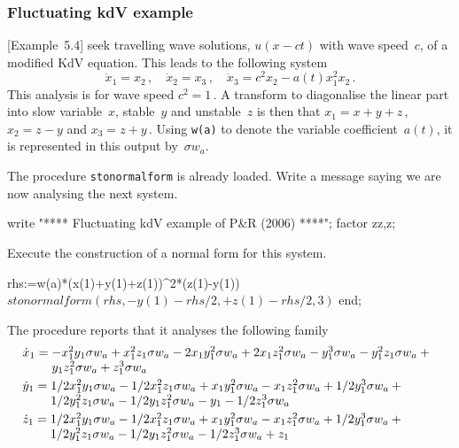 \subsubsection{Fluctuating kdV example}

\cite{Potzsche2006} [Example~5.4] seek travelling wave solutions, $u(x-ct)$ with wave speed~$c$, of a modified KdV equation.  
This leads to the following system 
\begin{equation*}
\dot x_1=x_2\,,\quad
\dot x_2=x_3\,,\quad
\dot x_3=c^2x_2-a(t)x_1^2x_2\,.
\end{equation*}
This analysis is for wave speed $c^2=1$\,.
A transform to diagonalise the linear part into slow variable~$x$, stable~$y$ and unstable~$z$ is then that $x_1=x+y+z$\,, $x_2=z-y$ and $x_3=z+y$\,.
Using \verb|w(a)| to denote the variable coefficient~$a(t)$, it is represented in this output by~$\sigma w_a$.

The procedure \verb|stonormalform| is already loaded.
Write a message saying we are now analysing the next system.
\begin{reduce}
write "**** Fluctuating kdV example of P&R (2006) ****";
factor zz,z;
\end{reduce}
Execute the construction of a normal form for this system.
\begin{reduce}
rhs:=w(a)*(x(1)+y(1)+z(1))^2*(z(1)-y(1))$
stonormalform(
    { rhs },
    { -y(1)-rhs/2 },
    { +z(1)-rhs/2 },
    3 )$
end; %
\end{reduce}


The procedure reports that it analyses the following family 
\begin{align*}&
\dot x_{1}=\ParMath{ -x_{1}^{2} y_{1} \sigma  w_{a}+x_{1}^{2} z_{1} \sigma  w_{a}-
2 x_{1} y_{1}^{2} \sigma  w_{a}+2 x_{1} z_{1}^{2} \sigma  w_{a}-y_{1}^{3
} \sigma  w_{a}-y_{1}^{2} z_{1} \sigma  w_{a}+y_{1} z_{1}^{2} \sigma  w_
{a}+z_{1}^{3} \sigma  w_{a}
}\\&
\dot y_{1}=\ParMath{ 1/2 x_{1}^{2} y_{1} \sigma  w_{a}-1/2 x_{1}^{2} z_{1} \sigma 
 w_{a}+x_{1} y_{1}^{2} \sigma  w_{a}-x_{1} z_{1}^{2} \sigma  w_{a}+1/2 y
_{1}^{3} \sigma  w_{a}+1/2 y_{1}^{2} z_{1} \sigma  w_{a}-1/2 y_{1} z_{1}
^{2} \sigma  w_{a}-y_{1}-1/2 z_{1}^{3} \sigma  w_{a}
}\\&
\dot z_{1}=\ParMath{ 1/2 x_{1}^{2} y_{1} \sigma  w_{a}-1/2 x_{1}^{2} z_{1} \sigma 
 w_{a}+x_{1} y_{1}^{2} \sigma  w_{a}-x_{1} z_{1}^{2} \sigma  w_{a}+1/2 y
_{1}^{3} \sigma  w_{a}+1/2 y_{1}^{2} z_{1} \sigma  w_{a}-1/2 y_{1} z_{1}
^{2} \sigma  w_{a}-1/2 z_{1}^{3} \sigma  w_{a}+z_{1}
}
\end{align*}



